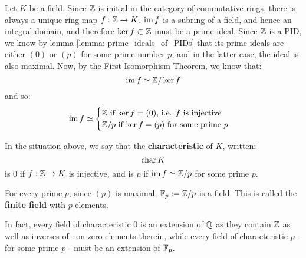        Let $K$ be a field. Since $\mathbb{Z}$ is initial in the category of commutative rings, there is always a unique ring map $f: \mathbb{Z} \to K$. $\operatorname{im} f$ is a subring of a field, and hence an integral domain, and therefore $\ker f \subset \mathbb{Z}$ must be a prime ideal. Since $\mathbb{Z}$ is a PID, we know by lemma \ref{lemma: prime_ideals_of_PIDs} that its prime ideals are either $(0)$ or $(p)$ for some prime number $p$, and in the latter case, the ideal is also maximal. Now, by the First Isomorphism Theorem, we know that:
            $$\operatorname{im} f \simeq \mathbb{Z}/\ker f$$
        and so:
            $$
                \operatorname{im} f \simeq  
                \begin{cases}
                    \text{$\mathbb{Z}$ if $\ker f = (0)$, i.e. $f$ is injective}
                    \\
                    \text{$\mathbb{Z}/p$ if $\ker f = (p)$ for some prime $p$}
                \end{cases}
            $$
        \begin{definition} \label{def: characteristics_of_fields}
            In the situation above, we say that the \textbf{characteristic} of $K$, written:
                $$\operatorname{char} K$$
            is $0$ if $f: \mathbb{Z} \to K$ is injective, and is $p$ if $\operatorname{im} f \simeq \mathbb{Z}/p$ for some prime $p$.
        \end{definition}
        \begin{convention}
            For every prime $p$, since $(p)$ is maximal, $\mathbb{F}_p := \mathbb{Z}/p$ is a field. This is called the \textbf{finite field} with $p$ elements.
        \end{convention}
        \begin{remark} \label{remark: extensions_have_the_same_characteristic_as_base}
            In fact, every field of characteristic $0$ is an extension of $\mathbb{Q}$ as they contain $\mathbb{Z}$ as well as inverses of non-zero elements therein, while every field of characteristic $p$ - for some prime $p$ - must be an extension of $\mathbb{F}_p$.
        \end{remark}
            
